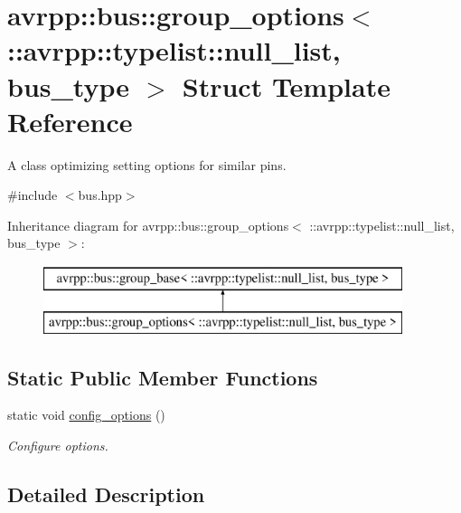 \hypertarget{structavrpp_1_1bus_1_1group__options_3_01_1_1avrpp_1_1typelist_1_1null__list_00_01bus__type_01_4}{
\section{avrpp::bus::group\_\-options$<$ ::avrpp::typelist::null\_\-list, bus\_\-type $>$ Struct Template Reference}
\label{structavrpp_1_1bus_1_1group__options_3_01_1_1avrpp_1_1typelist_1_1null__list_00_01bus__type_01_4}
}


A class optimizing setting options for similar pins.  




{\ttfamily \#include $<$bus.hpp$>$}

Inheritance diagram for avrpp::bus::group\_\-options$<$ ::avrpp::typelist::null\_\-list, bus\_\-type $>$:\begin{figure}[H]
\begin{center}
\leavevmode
\includegraphics[height=2.000000cm]{structavrpp_1_1bus_1_1group__options_3_01_1_1avrpp_1_1typelist_1_1null__list_00_01bus__type_01_4}
\end{center}
\end{figure}
\subsection*{Static Public Member Functions}
\begin{DoxyCompactItemize}
\item 
static void \hyperlink{structavrpp_1_1bus_1_1group__options_3_01_1_1avrpp_1_1typelist_1_1null__list_00_01bus__type_01_4_a7f5d59229e4164d29d7081719aea9cae}{config\_\-options} ()
\begin{DoxyCompactList}\small\item\em Configure options. \item\end{DoxyCompactList}\end{DoxyCompactItemize}


\subsection{Detailed Description}
